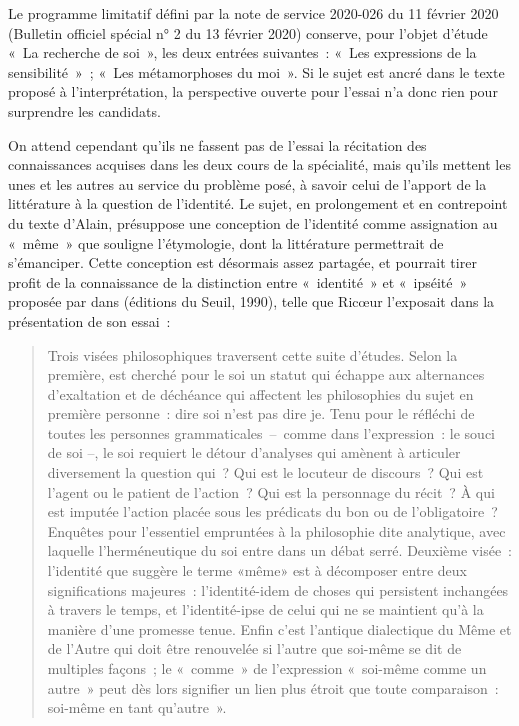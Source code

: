 {Le programme limitatif défini par la note de service 2020-026 du 11 février 2020
(Bulletin officiel spécial n° 2 du 13 février 2020) conserve, pour l'objet d'étude «~La
recherche de soi~», les deux entrées suivantes~: «~Les expressions de la sensibilité~»~;
«~Les métamorphoses du moi~». Si le sujet est ancré dans le texte proposé à
l'interprétation, la perspective ouverte pour l'essai n'a donc rien pour surprendre les
candidats.

On attend cependant qu'ils ne fassent pas de l'essai la récitation des connaissances
acquises dans les deux cours de la spécialité, mais qu'ils mettent les unes et les autres
au service du problème posé, à savoir celui de l'apport de la littérature à la question de
l'identité.
Le sujet, en prolongement et en contrepoint du texte d'Alain, présuppose une
conception de l'identité comme assignation au «~même~» que souligne l'étymologie,
dont la littérature permettrait de s'émanciper. Cette conception est désormais assez
partagée, et pourrait tirer profit de la connaissance de la distinction entre «~identité~»
et «~ipséité~» proposée par  dans  (éditions du
Seuil, 1990), telle que Ricœur l'exposait dans la présentation de son essai~:

\begin{quote}
Trois visées philosophiques traversent cette suite d'études.
Selon la première, est cherché pour le soi un statut qui échappe aux alternances
d'exaltation et de déchéance qui affectent les philosophies du sujet en première
personne~: dire soi n'est pas dire je. Tenu pour le réfléchi de toutes les personnes
grammaticales~--~comme dans l'expression~: le souci de soi --, le soi requiert le
détour d'analyses qui amènent à articuler diversement la question qui~? Qui
est le locuteur de discours~? Qui est l'agent ou le patient de l'action~? Qui est la
personnage du récit~? À qui est imputée l'action placée sous les prédicats du bon
ou de l'obligatoire~? Enquêtes pour l'essentiel empruntées à la philosophie dite
analytique, avec laquelle l'herméneutique du soi entre dans un débat serré.
Deuxième visée~: l'identité que suggère le terme «même» est à décomposer entre
deux significations majeures~: l'identité-idem de choses qui persistent inchangées à
travers le temps, et l'identité-ipse de celui qui ne se maintient qu'à la manière d'une
promesse tenue.
Enfin c'est l'antique dialectique du Même et de l'Autre qui doit être renouvelée
si l'autre que soi-même se dit de multiples façons~; le «~comme~» de l'expression
«~soi-même comme un autre~» peut dès lors signifier un lien plus étroit que toute
comparaison~: soi-même en tant qu'autre~».
\end{quote}

}
